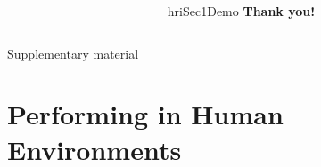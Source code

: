 \documentclass[compress]{beamer}
\begin{document}

{
\begin{frame}[plain]

    \begin{columns}
        \begin{column}{0.6\linewidth}
        \end{column}
        \begin{column}{0.4\linewidth}

\begin{beamercolorbox}[wd=\linewidth,ht=6ex,dp=0.7ex]{hriSec1Demo}
    \textbf{Thank you!}
    \vspace{3em}
\end{beamercolorbox}
        \end{column}
    \end{columns}
\end{frame}
}


\appendix
\begin{frame}[label=appendix]{Supplementary material}
    \small
    \begin{multicols}{2}
    \tableofcontents[hideallsubsections]
    \end{multicols}
\end{frame}

\section{Performing in Human Environments}



\end{document}
